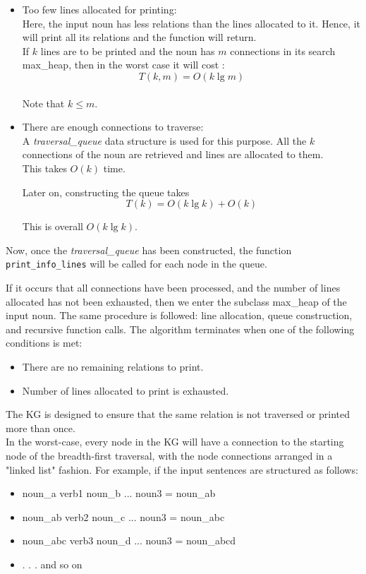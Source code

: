 \documentclass[conference]{IEEEtran}
\begin{document}
\begin{itemize}
\item Too few lines allocated for printing: 
\\Here, the input noun has less relations than the lines allocated to it. Hence, it will print all its relations and the function will return. 
\\If $k$ lines are to be printed and the noun has $m$ connections in its search max\_heap, then in the worst case it will cost :
\begin{equation}
T(k, m) = O(k \lg m)
\end{equation}
\\Note that $k \leq m$.
\\

\item There are enough connections to traverse:
\\
A \textit{traversal\_queue} data structure is used for this purpose. All the $k$ connections of the noun are retrieved and lines are allocated to them. 
\\
This takes $O(k)$ time.

Later on, constructing the queue takes
\begin{equation}
	T(k) = O(k \lg k) + O(k)
\end{equation}

This is overall $O(k \lg k)$.
\end{itemize}

Now, once the \textit{traversal\_queue} has been constructed, the function \texttt{print\_info\_lines} will be called for each node in the queue.

If it occurs that all connections have been processed, and the number of lines allocated has not been exhausted, then we enter the subclass max\_heap of the input noun. The same procedure is followed: line allocation, queue construction, and recursive function calls. The algorithm terminates when one of the following conditions is met:
\begin{itemize}
    \item There are no remaining relations to print.
    \item Number of lines allocated to print is exhausted.
\end{itemize}

The KG is designed to ensure that the same relation is not traversed or printed more than once.
\\
In the worst-case, every node in the KG will have a connection to the starting node of the breadth-first traversal, with the node connections arranged in a "linked list" fashion. For example, if the input sentences are structured as follows:
\begin{itemize}
    \item noun\_a verb1 noun\_b     ... noun3 = noun\_ab
    \item noun\_ab verb2 noun\_c	... noun3 = noun\_abc
    \item noun\_abc verb3 noun\_d   ... noun3 = noun\_abcd
    \item . . . and so on
\end{itemize}
\end{document}
